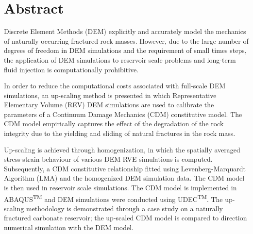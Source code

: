 \section{Abstract}
Discrete Element Methods (DEM) explicitly and accurately model the mechanics of naturally occurring fractured rock masses. However, due to the large number of degrees of freedom in DEM simulations and the requirement of small times steps, the application of DEM simulations to reservoir scale problems and long-term fluid injection is computationally prohibitive. 

In order to reduce the computational costs associated with full-scale DEM simulations, an up-scaling method is presented in which Representative Elementary Volume (REV) DEM simulations are used to calibrate the parameters of a Continuum Damage Mechanics (CDM) constitutive model. The CDM model empirically captures the effect of the degradation of the rock integrity due to the yielding and sliding of natural fractures in the rock mass. 

Up-scaling is achieved through homogenization, in which the spatially averaged stress-strain behaviour of various DEM RVE simulations is computed. Subsequently, a CDM constitutive relationship fitted using Levenberg-Marquardt Algorithm (LMA) and the homogenized DEM simulation data. The CDM model is then used in reservoir scale simulations. The CDM model is implemented in ABAQUS\textsuperscript{TM} and DEM simulations were conducted using UDEC\textsuperscript{TM}. The up-scaling methodology is demonstrated through a case study on a naturally fractured carbonate reservoir; the up-scaled CDM model is compared to direction numerical simulation with the DEM model.
